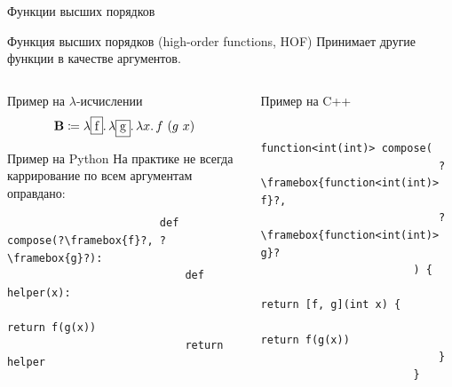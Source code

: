     \begin{frame}[fragile]{Функции высших порядков}
        \begin{block}{Функция высших порядков (high-order functions, HOF)}
            Принимает другие функции в качестве аргументов.
        \end{block}
        \vspace{-1em}
        \begin{columns}[onlytextwidth]
            \begin{column}[t]{0.485\textwidth}
                \begin{block}{Пример на $\lambda$-исчислении}
                    \[\comb{B} \termdef \lambda \framebox{f} \ldotp \lambda \framebox{g} \ldotp \lambda x\ldotp f~(g~x)\]
                \end{block}
                \pause
                \begin{block}{Пример на Python}
                    На практике не всегда каррирование по всем аргументам оправдано:
                    \begin{verbatim}
                        def compose(?\framebox{f}?, ?\framebox{g}?):
                            def helper(x):
                                return f(g(x))
                            return helper
                    \end{verbatim}
                \end{block}
            \end{column}\hfill
            \pause%
            \begin{column}[t]{0.485\textwidth}
                \begin{block}{Пример на C++}
                    \begin{verbatim}
                        function<int(int)> compose(
                            ?\framebox{function<int(int)> f}?,
                            ?\framebox{function<int(int)> g}?
                        ) {
                            return [f, g](int x) {
                                return f(g(x))
                            }
                        }
                    \end{verbatim}
                \end{block}
            \end{column}
        \end{columns}
    \end{frame}



